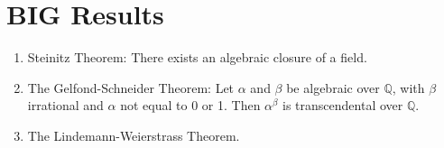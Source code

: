 \documentclass[12pt]{article}
\theoremstyle{definition}
\begin{document}
\section{BIG Results}

\begin{enumerate}
\item Steinitz Theorem: There exists an algebraic closure of a field.
\item The Gelfond-Schneider Theorem: Let $\alpha$ and $\beta$ be algebraic over $\mathbb{Q}$, with $\beta$ irrational and $\alpha$ not equal to 0 or 1. Then $\alpha^{\beta}$ is transcendental over $\mathbb{Q}$.

\item The Lindemann-Weierstrass Theorem.
\end{enumerate}
\end{document}
